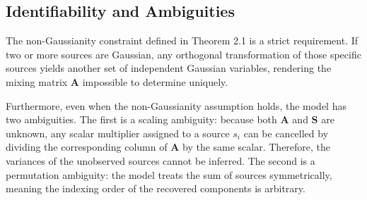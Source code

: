 \documentclass[12pt,a4paper,twoside,openany]{book}
\begin{document}
\subsection{Identifiability and Ambiguities}
The non-Gaussianity constraint defined in Theorem 2.1 is a strict requirement. If two or more sources are Gaussian, 
any orthogonal transformation of those specific sources yields another set of independent Gaussian variables, 
rendering the mixing matrix $\mathbf{A}$ impossible to determine uniquely. 

Furthermore, even when the non-Gaussianity assumption holds, the model has two ambiguities. 
The first is a scaling ambiguity: because both $\mathbf{A}$ and $\mathbf{S}$ are unknown, any scalar multiplier assigned 
to a source $s_i$ can be cancelled by dividing the corresponding column of $\mathbf{A}$ by the same scalar. 
Therefore, the variances of the unobserved sources cannot be inferred. The second is a permutation ambiguity: 
the model treats the sum of sources symmetrically, meaning the indexing order of the recovered components is arbitrary. 
\end{document}
